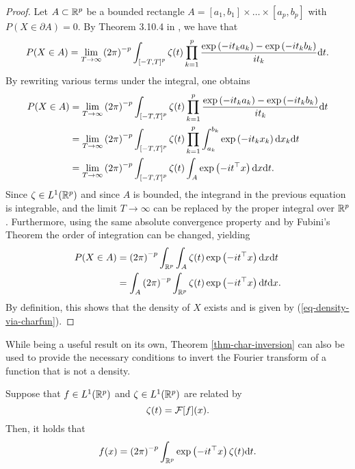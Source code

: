 \begin{proof}
    Let $A \subset \Rp$ be a bounded rectangle $A = [a_1, b_1] \times \ldots \times [a_p, b_p]$ with $P(X \in \partial A) = 0$. By Theorem 3.10.4 in \cite{durrett_2019}, we have that
    \begin{equation*}
        P(X \in A) = \lim_{T \rightarrow \infty} \left(2\pi\right)^{-p}\int_{\left[-T, T\right]^p} \zeta(t) \prod_{k=1}^p \frac{\expf{-it_k a_k} - \expf{-it_k b_k}}{i t_k} \d t.
    \end{equation*}
    By rewriting various terms under the integral, one obtains
    \begin{align*}
        P(X \in A) 
        &= \lim_{T \rightarrow \infty} \left(2\pi\right)^{-p}\int_{\left[-T, T\right]^p} \zeta(t) \prod_{k=1}^p \frac{\expf{-it_k a_k} - \expf{-it_k b_k}}{i t_k} \d t \\
        &= \lim_{T \rightarrow \infty} \left(2\pi\right)^{-p}\int_{\left[-T, T\right]^p} \zeta(t) \prod_{k=1}^p \int_{a_k}^{b_k}\expf{-i t_k x_k} \d x_k \d t \\
        &= \lim_{T \rightarrow \infty} \left(2\pi\right)^{-p}\int_{\left[-T, T\right]^p} \zeta(t) \int_A \expf{-i t^\top x} \d x \d t.
    \end{align*}
    Since $\zeta \in L^1(\Rp)$ and since $A$ is bounded, the integrand in the previous equation is integrable, and the limit $T \rightarrow \infty$ can be replaced by the proper integral over $\Rp$. Furthermore, using the same absolute convergence property and by Fubini's Theorem the order of integration can be changed, yielding
    \begin{align*}
        P(X \in A) 
        &= \left(2\pi\right)^{-p}\intRp{t}{\int_A \zeta(t) \expf{-i t^\top x} \d x} \\
        &= \int_A \left(2\pi\right)^{-p} \intRp{t}{\zeta(t) \expf{-i t^\top x} } \d x.
    \end{align*}
    By definition, this shows that the density of $X$ exists and is given by (\ref{eq-density-via-charfun}).
\end{proof}

While being a useful result on its own, Theorem \ref{thm-char-inversion} can also be used to provide the necessary conditions to invert the Fourier transform of a function that is not a density.

\begin{corollary} \label{corr-fourier-inv}
    Suppose that $f \in L^1(\Rp)$ and $\zeta \in L^1(\Rp)$ are related by
    \begin{equation}\label{eq-fourier-trans}
        \zeta(t) = \F[f](x).
    \end{equation}
    Then, it holds that
    \begin{equation} \label{eq-fourier-inv}
        f(x) = \left(2\pi\right)^{-p}\int_\Rp \expf{-i t^\top x} \zeta(t) \d t.
    \end{equation}
\end{corollary}

